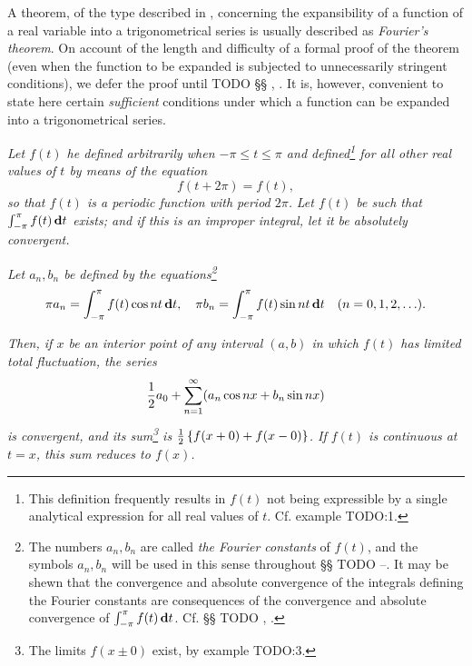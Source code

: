 A theorem, of the type described in , concerning the
expansibility of a function of a real variable into a trigonometrical
series is usually described
%
%
as \emph{Fourier's theorem}. On account of the length and difficulty of a
formal proof of the theorem (even when the function to be expanded is
subjected to unnecessarily stringent conditions), we defer the proof
until TODO §§ , .
It is, however, convenient to state here certain
\emph{sufficient} conditions under which a function can be expanded into a
trigonometrical series.

\emph{Let $f(t)$ he defined arbitrarily when $-\pi \leq t \leq \pi$
  and defined\footnote{This definition frequently results in $f(t)$ not being
    expressible by a single analytical expression for all real values of $t$.
    Cf. example TODO:1.}
  for all other real values of $t$ by means of the equation
  $$
  f(t + 2\pi) = f(t),
  $$
  so that $f(t)$ is a periodic function with period $2\pi$.
}
\emph{
  Let $f(t)$ be such that
  $\int_{-\pi}^{\pi} f(t) \, \mathbf{d} t$ exists; and if this is an improper
  integral, let it be absolutely convergent.
}

\emph{
  Let $a_{n}, b_{n}$ be defined by the
  equations\footnote{The numbers $a_{n}, b_{n}$ are called
    \emph{the Fourier constants} of
    $f(t)$, and the symbols $a_{n}, b_{n}$ will be used in this sense throughout
    §§ TODO --.
    It may be shewn that the convergence and absolute convergence of the
    integrals defining the Fourier constants are consequences of the
    convergence and absolute convergence of
    $\int_{-\pi}^{\pi} f(t) \, \mathbf{d} t$.
    Cf. §§ TODO , .}
  $$
  \pi a_{n} = \int_{-\pi}^{\pi} f(t) \cos nt \, \mathbf{d} t,
  \quad
  \pi b_{n} = \int_{-\pi}^{\pi} f(t) \sin nt \, \mathbf{d} t
  \quad
  (n=0,1,2,\ldots).
  $$
}

\emph{
  Then, if $x$ be an interior point of any interval $(a, b)$ in which
  $f(t)$ has limited total fluctuation, the series
  $$
  \frac{1}{2} a_{0}
  +
  \sum_{n=1}^{\infty} (a_{n} \cos nx + b_{n} \sin nx)
  $$
  is convergent, and its sum\footnote{The limits $f(x \pm 0)$ exist,
    by  example TODO:3.}
  is $\frac{1}{2} \left\{  f(x+0) + f(x-0)  \right\}$.
  If $f(t)$ is continuous at $t=x$, this sum reduces to $f(x)$.
}

